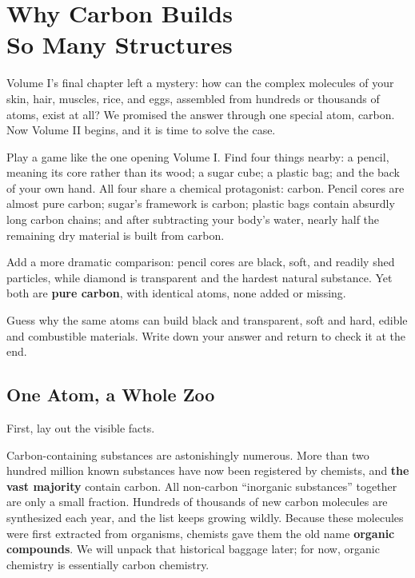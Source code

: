 \chapter[Why Carbon Builds So Many Structures]{Why Carbon Builds\protect\\ So Many Structures}

\begin{kaichang}
Volume I's final chapter left a mystery: how can the complex molecules of your skin, hair, muscles, rice, and eggs, assembled from hundreds or thousands of atoms, exist at all? We promised the answer through one special atom, carbon. Now Volume II begins, and it is time to solve the case.

Play a game like the one opening Volume I. Find four things nearby: a pencil, meaning its core rather than its wood; a sugar cube; a plastic bag; and the back of your own hand. All four share a chemical protagonist: carbon. Pencil cores are almost pure carbon; sugar's framework is carbon; plastic bags contain absurdly long carbon chains; and after subtracting your body's water, nearly half the remaining dry material is built from carbon.

Add a more dramatic comparison: pencil cores are black, soft, and readily shed particles, while diamond is transparent and the hardest natural substance. Yet both are \textbf{pure carbon}, with identical atoms, none added or missing.

Guess why the same atoms can build black and transparent, soft and hard, edible and combustible materials. Write down your answer and return to check it at the end.
\end{kaichang}

\section{One Atom, a Whole Zoo}

First, lay out the visible facts.

Carbon-containing substances are astonishingly numerous. More than two hundred million known substances have now been registered by chemists, and \textbf{the vast majority} contain carbon. All non-carbon ``inorganic substances'' together are only a small fraction. Hundreds of thousands of new carbon molecules are synthesized each year, and the list keeps growing wildly. Because these molecules were first extracted from organisms, chemists gave them the old name \textbf{organic compounds}. We will unpack that historical baggage later; for now, organic chemistry is essentially carbon chemistry.

